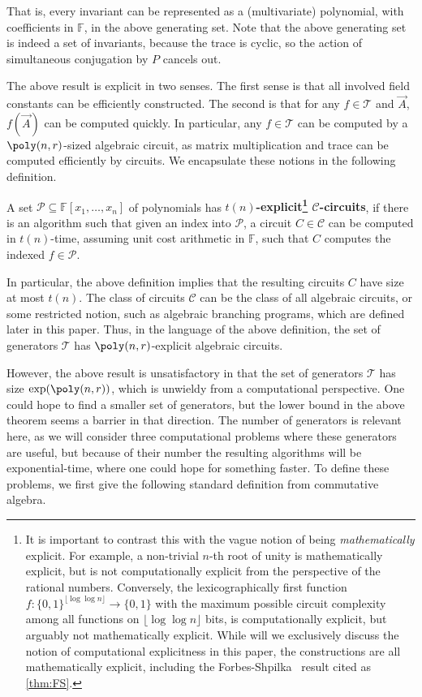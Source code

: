 \documentclass[letterpaper,11pt]{article}
\numberwithin{equation}{section}
\theoremstyle{plain}
\theoremstyle{remark}
\newcommand{\F}{\mathbb{F}}
\newcommand{\cC}{\mathcal{C}}
\newcommand{\cP}{\mathcal{P}}
\newcommand{\cT}{\mathcal{T}}
\begin{document}
That is, every invariant can be represented as a (multivariate) polynomial, with coefficients in $\F$, in the above generating set. Note that the above generating set is indeed a set of invariants, because the trace is cyclic, so the action of simultaneous conjugation by $P$ cancels out.

The above result is explicit in two senses.  The first sense is that all involved field constants can be efficiently constructed.  The second is that for any $f\in \cT$ and $\vec{A}$, $f(\vec{A})$ can be computed quickly.  In particular, any $f\in \cT$ can be computed by a $\poly(n,r)$-sized algebraic circuit, as matrix multiplication and trace can be computed efficiently by circuits.  We encapsulate these notions in the following definition.

\begin{definition}
	A set $\cP\subseteq\F[x_1,\ldots,x_n]$ of polynomials has \textbf{$t(n)$-explicit\footnote{It is important to contrast this with the vague notion of being \textit{mathematically} explicit.  For example, a non-trivial $n$-th root of unity is mathematically explicit, but is not computationally explicit from the perspective of the rational numbers.  Conversely, the lexicographically first function $f:\{0,1\}^{\lfloor \log\log n\rfloor}\to\{0,1\}$ with the maximum possible circuit complexity among all functions on $\lfloor \log\log n\rfloor$ bits, is computationally explicit, but arguably not mathematically explicit. While will we exclusively discuss the notion of computational explicitness in this paper, the constructions are all mathematically explicit, including the Forbes-Shpilka~\cite{ForbesShpilka12a} result cited as \autoref{thm:FS}.} $\cC$-circuits}, if there is an algorithm such that given an index into $\cP$, a circuit $C\in\cC$ can be computed in $t(n)$-time, assuming unit cost arithmetic in $\F$, such that $C$ computes the indexed $f\in\cP$.
\end{definition}

In particular, the above definition implies that the resulting circuits $C$ have size at most $t(n)$. The class of circuits $\cC$ can be the class of all algebraic circuits, or some restricted notion, such as algebraic branching programs, which are defined later in this paper. Thus, in the language of the above definition, the set of generators $\cT$ has $\poly(n,r)$-explicit algebraic circuits.

However, the above result is unsatisfactory in that the set of generators $\cT$ has size $\exp(\poly(n,r))$, which is unwieldy from a computational perspective. One could hope to find a smaller set of generators, but the lower bound in the above theorem seems a barrier in that direction. The number of generators is relevant here, as we will consider three computational problems where these generators are useful, but because of their number the resulting algorithms will be exponential-time, where one could hope for something faster. To define these problems, we first give the following standard definition from commutative algebra.
\end{document}
